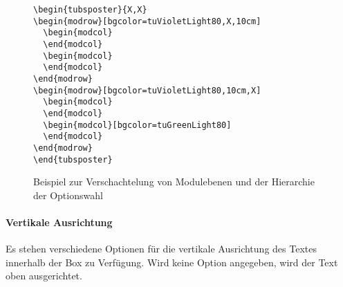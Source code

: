 \begin{figure}[!ht]
\small
\centering
\begin{minipage}{0.7\textwidth}
\begin{lstlisting}
\begin{tubsposter}{X,X}
\begin{modrow}[bgcolor=tuVioletLight80,X,10cm]
  \begin{modcol}
  \end{modcol}
  \begin{modcol}
  \end{modcol}
\end{modrow}
\begin{modrow}[bgcolor=tuVioletLight80,10cm,X]
  \begin{modcol}
  \end{modcol}
  \begin{modcol}[bgcolor=tuGreenLight80]
  \end{modcol}
\end{modrow}
\end{tubsposter}
\end{lstlisting}
\end{minipage}
\centering
{}
\caption{Beispiel zur Verschachtelung von Modulebenen und der Hierarchie der Optionswahl}
\label{fig:poster:module_option_hierarchy}
\end{figure}


\paragraph{Vertikale Ausrichtung}\hfill

Es stehen verschiedene Optionen für die vertikale Ausrichtung des Textes
innerhalb der Box zu Verfügung. Wird keine Option angegeben, wird
der Text oben ausgerichtet.

\begin{Declaration}
  \\
  \\
\end{Declaration}

